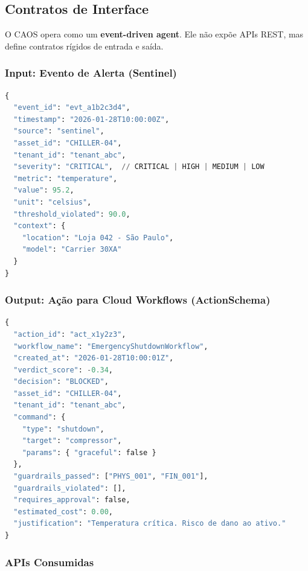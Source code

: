 \documentclass[12pt, a4paper]{article}
\begin{document}
\subsection{Contratos de Interface}

O CAOS opera como um \textbf{event-driven agent}. Ele não expõe APIs REST, mas define contratos rígidos de entrada e saída.

\subsubsection{Input: Evento de Alerta (Sentinel)}

\begin{lstlisting}[language=Python, caption=Schema de Entrada - AlertEvent]
{
  "event_id": "evt_a1b2c3d4",
  "timestamp": "2026-01-28T10:00:00Z",
  "source": "sentinel",
  "asset_id": "CHILLER-04",
  "tenant_id": "tenant_abc",
  "severity": "CRITICAL",  // CRITICAL | HIGH | MEDIUM | LOW
  "metric": "temperature",
  "value": 95.2,
  "unit": "celsius",
  "threshold_violated": 90.0,
  "context": {
    "location": "Loja 042 - São Paulo",
    "model": "Carrier 30XA"
  }
}
\end{lstlisting}

\subsubsection{Output: Ação para Cloud Workflows (ActionSchema)}

\begin{lstlisting}[language=Python, caption=Schema de Saída - ActionSchema (destinado ao CARE)]
{
  "action_id": "act_x1y2z3",
  "workflow_name": "EmergencyShutdownWorkflow",
  "created_at": "2026-01-28T10:00:01Z",
  "verdict_score": -0.34,
  "decision": "BLOCKED",
  "asset_id": "CHILLER-04",
  "tenant_id": "tenant_abc",
  "command": {
    "type": "shutdown",
    "target": "compressor",
    "params": { "graceful": false }
  },
  "guardrails_passed": ["PHYS_001", "FIN_001"],
  "guardrails_violated": [],
  "requires_approval": false,
  "estimated_cost": 0.00,
  "justification": "Temperatura crítica. Risco de dano ao ativo."
}
\end{lstlisting}

\subsubsection{APIs Consumidas}
\end{document}
